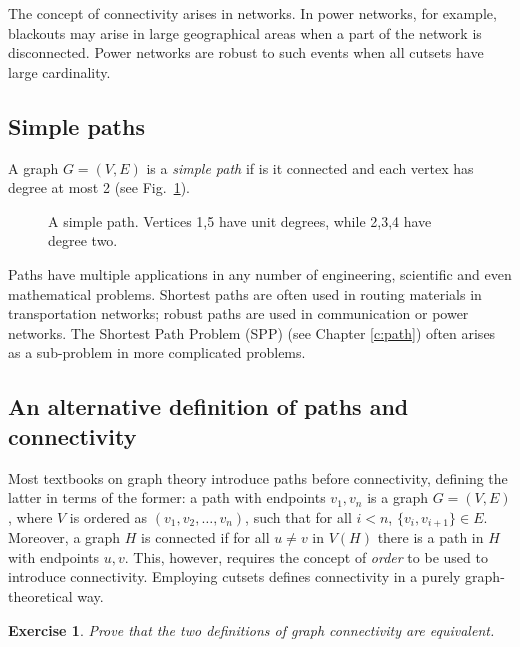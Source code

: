 \documentclass[a4paper]{book}
\theoremstyle{changebreak}                %
\newtheorem{ex}[result]{Exercise}
\begin{document}
The concept of connectivity arises in networks. In power networks, for
example, blackouts may arise in large geographical areas when a part
of the network is disconnected. Power networks are robust to such
events when all cutsets have large cardinality.

\subsection{Simple paths}
A graph $G=(V,E)$ is a {\it simple path} if is it
connected and each vertex has degree at most 2 (see
Fig.~\ref{f:path}).
\begin{figure}[!ht]
\begin{center}
\end{center}
\caption{A simple path. Vertices 1,5 have unit degrees, while 2,3,4 have
  degree two.}
\label{f:path}
\end{figure}

Paths have multiple applications in any number of engineering,
scientific and even mathematical problems. Shortest paths are often
used in routing materials in transportation networks; robust paths are
used in communication or power networks. The {\sc Shortest Path
  Problem}
(SPP) (see Chapter \ref{c:path}) often arises as a
sub-problem in more complicated problems.

\subsection{An alternative definition of paths and connectivity}
Most textbooks on graph theory introduce paths before connectivity,
defining the latter in terms of the former: a path with
endpoints $v_1,v_n$ is a graph $G=(V,E)$, where
$V$ is ordered as $(v_1,v_2,\ldots,v_n)$, such that for all $i<n$,
$\{v_i,v_{i+1}\}\in E$. Moreover, a graph $H$ is connected if for all
$u\not=v$ in $V(H)$ there is a path in $H$ with endpoints $u,v$. This,
however, requires the concept of {\it order} to be used
to introduce connectivity. Employing cutsets defines connectivity in a
purely graph-theoretical way.
\begin{ex}
Prove that the two definitions of graph connectivity are equivalent.
\end{ex}
\end{document}
